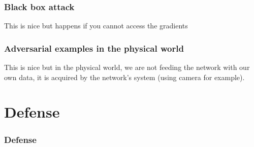 \documentclass[9pt]{beamer}
\begin{document}
\begin{frame}
  \frametitle{Black box attack}

  This is nice but happens if you cannot access the gradients

\end{frame}

\begin{frame}
  \frametitle{Adversarial examples in the physical world}

  This is nice but in the physical world, we are not feeding the
  network with our own data, it is acquired by the network's system
  (using camera for example).

\end{frame}

\section{Defense}

\begin{frame}
  \frametitle{Defense}
\end{frame}
\end{document}

